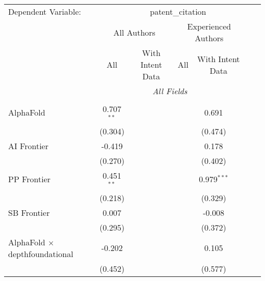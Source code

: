 \begingroup
\centering
\begin{tabular}{lcccccccc}
   \tabularnewline \midrule \midrule
   Dependent Variable: & \multicolumn{8}{c}{patent\_citation}\\
 & \multicolumn{3}{c}{All Authors} & \multicolumn{3}{c}{Experienced Authors} \\
\cmidrule(lr){2-4} \cmidrule(lr){5-7}
 & \multicolumn{1}{c}{All} & \multicolumn{2}{c}{With Intent Data} & \multicolumn{1}{c}{All} & \multicolumn{2}{c}{With Intent Data} \\
\cmidrule(lr){2-2} \cmidrule(lr){3-4} \cmidrule(lr){5-5} \cmidrule(lr){6-7}
 & \multicolumn{6}{c}{\textit{All Fields}} \\ \\
   AlphaFold                                      & 0.707$^{**}$ &               &       &       & 0.691         &               &       &   \\   
                                                  & (0.304)      &               &       &       & (0.474)       &               &       &   \\   
   AI Frontier                                    & -0.419       &               &       &       & 0.178         &               &       &   \\   
                                                  & (0.270)      &               &       &       & (0.402)       &               &       &   \\   
   PP Frontier                                    & 0.451$^{**}$ &               &       &       & 0.979$^{***}$ &               &       &   \\   
                                                  & (0.218)      &               &       &       & (0.329)       &               &       &   \\   
   SB Frontier                                    & 0.007        &               &       &       & -0.008        &               &       &   \\   
                                                  & (0.295)      &               &       &       & (0.372)       &               &       &   \\   
   AlphaFold $\times$ depthfoundational           & -0.202       &               &       &       & 0.105         &               &       &   \\   
                                                  & (0.452)      &               &       &       & (0.577)       &               &       &   \\   

\end{tabular}

